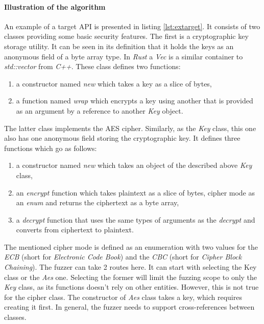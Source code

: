 \paragraph{Illustration of the algorithm}
An example of a target API is presented in listing \ref{lst:extarget}. It consists of two classes providing some basic security features. The first is a cryptographic key storage utility. It can be seen in its definition that it holds the keys as an anonymous field of a byte array type. In \textit{Rust} a \textit{Vec} is a similar container to \textit{std::vector} from \textit{C++}. These class defines two functions:
\begin{enumerate}
    \item a constructor named \textit{new} which takes a key as a slice of bytes,
    \item a function named \textit{wrap} which encrypts a key using another that is provided as an argument by a reference to another \textit{Key} object.
\end{enumerate}
The latter class implements the AES cipher. Similarly, as the \textit{Key} class, this one also has one anonymous field storing the cryptographic key. It defines three functions which go as follows:
\begin{enumerate}
    \item a constructor named \textit{new} which takes an object of the described above \textit{Key} class,
    \item an \textit{encrypt} function which takes plaintext as a slice of bytes, cipher mode as an \textit{enum} and returns the ciphertext as a byte array,
    \item a \textit{decrypt} function that uses the same types of arguments as the \textit{decrypt} and converts from ciphertext to plaintext.
\end{enumerate}
The mentioned cipher mode is defined as an enumeration with two values for the \textit{ECB} (short for \textit{Electronic Code Book}) and the \textit{CBC} (short for \textit{Cipher Block Chaining}). The fuzzer can take 2 routes here. It can start with selecting the Key class or the \textit{Aes} one. Selecting the former will limit the fuzzing scope to only the \textit{Key} class, as its functions doesn't rely on other entities. However, this is not true for the cipher class. The constructor of \textit{Aes} class takes a key, which requires creating it first. In general, the fuzzer needs to support cross-references between classes.

